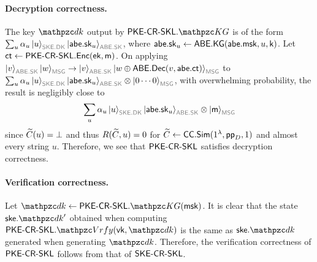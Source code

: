 \paragraph{Decryption correctness.}
The key
$\qdk$ output by $\PKECRSKL.\qKG$ is of the form $\sum_u \alpha_u
\ket{u}_{\qreg{SKE.DK}}\ket{\abe.\sk_u}_{\qreg{ABE.SK}}$, where
$\mathsf{abe}.\mathsf{sk}_u\leftarrow\mathsf{ABE}.\mathsf{KG}(\mathsf{abe}.\mathsf{msk},u, \mathsf{k})$.
Let $\mathsf{ct}\leftarrow\mathsf{PKE}\textrm{-}\mathsf{CR}\textrm{-}\mathsf{SKL}.\mathsf{Enc}(\mathsf{ek},\mathsf{m})$.
On applying $\ket{v}_{\qreg{ABE.SK}}\ket{w}_{\qreg{MSG}}\ra\ket{v}_{\qreg{ABE.SK}}\ket{w\oplus\ABE.\Dec(v,\abe.\ct)}_{\qreg{MSG}}$ to $\sum_u \alpha_u \ket{u}_{\qreg{SKE.DK}}\ket{\abe.\sk_u}_{\qreg{ABE.SK}} \tensor \ket{0\cdots0}_{\qreg{MSG}}$, with overwhelming probability, the result is negligibly close to
\begin{align}
\sum_u \alpha_u \ket{u}_{\qreg{SKE.DK}}\ket{\abe.\sk_u}_{\qreg{ABE.SK}} \tensor \ket{\msg}_{\qreg{MSG}}
\end{align}
since $\widetilde{C}(u)=\bot$ and thus $R(\widetilde{C},u)=0$ for $\widetilde{C}\leftarrow\mathsf{CC}.\mathsf{Sim}(1^\lambda,\mathsf{pp}_D,1)$ and almost every string $u$.
Therefore, we see that $\mathsf{PKE}\textrm{-}\mathsf{CR}\textrm{-}\mathsf{SKL}$ satisfies decryption correctness.

\paragraph{Verification correctness.}
Let $\qdk\gets\PKECRSKL.\qKG(\msk)$.
It is clear that the state $\ske.\qdk^\prime$ obtained when computing $\PKECRSKL.\qVrfy(\vk,\qdk)$ is the same as $\ske.\qdk$ generated when generating $\qdk$.
Therefore, the verification correctness of $\mathsf{PKE}\textrm{-}\mathsf{CR}\textrm{-}\mathsf{SKL}$ follows from that of $\mathsf{SKE}\textrm{-}\mathsf{CR}\textrm{-}\mathsf{SKL}$.

